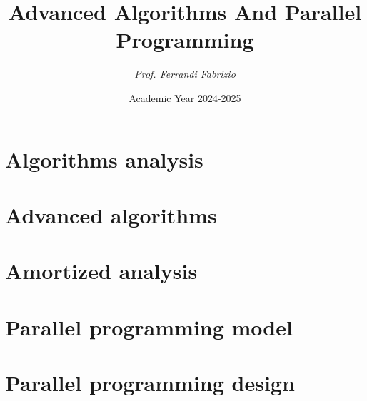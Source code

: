 \documentclass[12pt, a4paper]{report}
\title{\textbf{Advanced Algorithms And Parallel Programming}}
\author{\textit{Prof. Ferrandi Fabrizio}}
\date{Academic Year 2024-2025}
\begin{document}
    \maketitle

    

    \cleardoublepage

    \tableofcontents

    \cleardoublepage

    \chapter{Algorithms analysis}
    
    
    

    \chapter{Advanced algorithms}
    
    
    
    
    
    
    
    

    \chapter{Amortized analysis}
    
    
    
    

    \chapter{Parallel programming model}
    
    
    
    
    

    \chapter{Parallel programming design}
    
    
    
    
\end{document}
